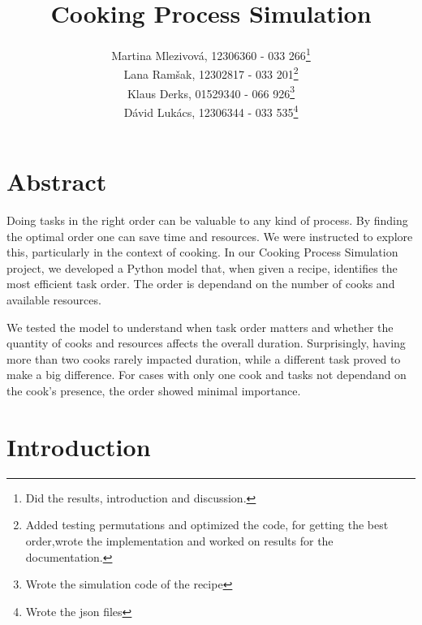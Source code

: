 \documentclass[a4paper,11pt]{scrartcl}
\begin{document}
\subject{Modeling and Simulation}
\title{Cooking Process Simulation}

\publishers{Supervisor: Martin Bicher}
\author{Martina Mlezivová, 12306360 - 033 266\footnote{Did the results, introduction and discussion.}\\ %
Lana Ramšak, 12302817 - 033 201\footnote{Added testing permutations and optimized the code, for getting the best order,wrote the implementation and worked on results for the documentation.} \\       %
Klaus Derks, 01529340 - 066 926\footnote{Wrote the simulation code of the recipe} \\ %
Dávid Lukács, 12306344 - 033 535\footnote{Wrote the json files}} %
\maketitle

\section*{Abstract}

Doing tasks in the right order can be valuable to any kind of process. 
By finding the optimal order one can save time and resources. We were instructed to explore this, particularly in the context of cooking. 
In our Cooking Process Simulation project, we developed a Python model that, when given a recipe, identifies the most efficient task order.
The order is dependand on the number of cooks and available resources.

We tested the model to understand when task order matters and whether 
the quantity of cooks and resources affects the overall duration. Surprisingly, having more than two cooks rarely impacted duration, while a 
different task proved to make a big difference. For cases with only one cook and tasks not dependand on the cook's presence, the order showed minimal importance.

\newpage

\tableofcontents

\newpage

\section{Introduction}


\end{document}
